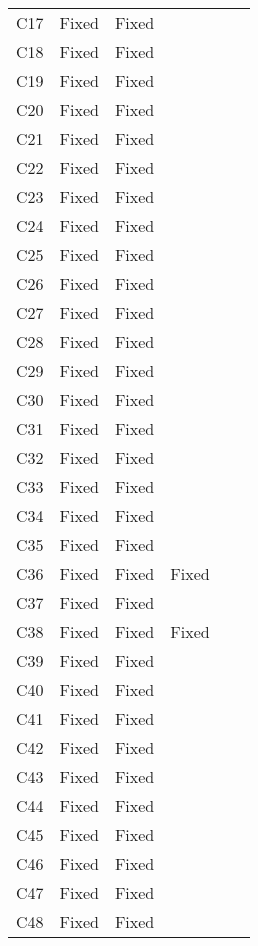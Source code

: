 \begin{table}[!t]
{\begin{tabular}{|c|c|c|c|c|c|}
C17               & Fixed     &Fixed   \\
C18               & Fixed     &Fixed   \\
C19               & Fixed     &Fixed   \\
C20               & Fixed     &Fixed   \\
C21               & Fixed     &Fixed   \\
C22               & Fixed     &Fixed   \\
C23               & Fixed     &Fixed   \\
C24               & Fixed     &Fixed   \\
C25               & Fixed     &Fixed   \\
C26               & Fixed     &Fixed   \\
C27               & Fixed     &Fixed   \\
C28               & Fixed     &Fixed   \\
C29               & Fixed     &Fixed   \\
C30               & Fixed     &Fixed   \\
C31               & Fixed     &Fixed   \\
C32               & Fixed     &Fixed   \\
C33               & Fixed     &Fixed   \\
C34               & Fixed     &Fixed   \\
C35               & Fixed     &Fixed   \\
C36               & Fixed     & Fixed     &Fixed   \\
C37               & Fixed     &Fixed   \\
C38               & Fixed     & Fixed     &Fixed   \\
C39               & Fixed     &Fixed   \\
C40               & Fixed     &Fixed   \\
C41               & Fixed     &Fixed   \\
C42               & Fixed     &Fixed   \\
C43               & Fixed     &Fixed   \\
C44               & Fixed     &Fixed   \\
C45               & Fixed     &Fixed   \\
C46               & Fixed     &Fixed   \\
C47               & Fixed     &Fixed   \\
C48               & Fixed     &Fixed   \\

\end{tabular}}
\end{table}
